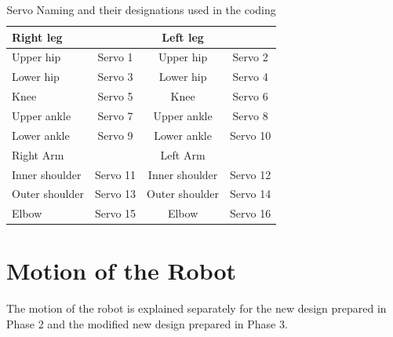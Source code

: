 \documentclass[12pt]{article}
\begin{document}
\begin{table}[h!]
	\centering
	\begin{tabular}{ |l|c|c|c| } 
		\hline
		Right leg & & Left leg &  \\
		\hline
	Upper hip & Servo 1 & Upper hip & Servo 2\\
	Lower hip & Servo 3 & Lower hip & Servo 4\\
	Knee & Servo 5 & Knee & Servo 6\\
	Upper ankle & Servo 7 & Upper ankle & Servo 8\\
	Lower ankle & Servo 9 & Lower ankle & Servo 10\\
	\hline
	Right Arm  & & Left Arm &\\
	\hline
	Inner shoulder & Servo 11 & Inner shoulder & Servo 12\\
	Outer shoulder & Servo 13 & Outer shoulder & Servo 14\\
	Elbow & Servo 15 & Elbow & Servo 16\\
		\hline
		
		
	\end{tabular}
	\caption{Servo Naming and their designations used in the coding}
	\label{tab2: Servo_num}
\end{table}
\newpage

\section{Motion of the Robot}
The motion of the robot is explained separately for the new design prepared in Phase 2 and
the modified new design prepared in Phase 3.
\end{document}
